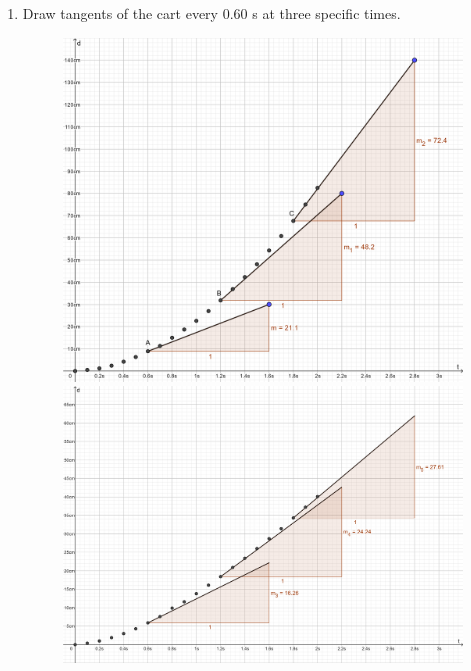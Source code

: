 \documentclass[12pt]{article}
\begin{document}
\begin{enumerate}
\begin{figure}[H]
\begin{minipage}{0.4\textwidth}
        \end{minipage}
    \end{figure}
    \item Draw tangents of the cart every $0.60$ s at three specific times.
    \begin{figure}[H]
        \centering
        \begin{minipage}{0.4\textwidth}
            \centering
            \includegraphics[scale=1.25]{LabReportImg/5TB-Tangents.png}
        \end{minipage}
        \begin{minipage}{0.4\textwidth}
            \centering
            \includegraphics[scale=1.25]{LabReportImg/3TB-Tangents.png}

\end{minipage}
\end{figure}
\end{enumerate}
\end{document}
